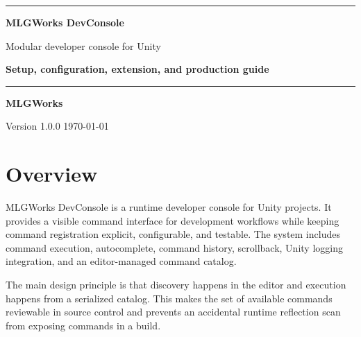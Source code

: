 \documentclass[11pt,a4paper]{article}
\begin{document}
\hypersetup{pageanchor=false}

\begin{titlepage}
  \centering
  \vspace*{28mm}
  {\color{mlgcyan}\rule{0.22\textwidth}{3pt}\par}
  \vspace{8mm}
  {\Huge\bfseries\color{mlgblue} MLGWorks DevConsole\par}
  \vspace{6mm}
  {\Large Modular developer console for Unity\par}
  \vspace{18mm}
  \begin{tcolorbox}[
    width=0.78\textwidth,
    colback=mlgblue!7,
    colframe=mlgblue!55,
    boxrule=0.8pt,
    arc=2mm,
    left=8mm,
    right=8mm,
    top=5mm,
    bottom=5mm]
    \centering
    {\large\bfseries Setup, configuration, extension, and production guide\par}
  \end{tcolorbox}
  \vspace{8mm}
  {\color{mlgcyan}\rule{0.12\textwidth}{1.5pt}\par}
  \vfill
  {\large\bfseries MLGWorks\par}
  \vspace{2mm}
  {\large Version 1.0.0 \textcolor{gray}{\textbullet} \today\par}
\end{titlepage}

\clearpage
{}
\tableofcontents
\clearpage
\hypersetup{pageanchor=true}
\newpage

\section{Overview}

MLGWorks DevConsole is a runtime developer console for Unity projects. It provides a visible command interface for development workflows while keeping command registration explicit, configurable, and testable. The system includes command execution, autocomplete, command history, scrollback, Unity logging integration, and an editor-managed command catalog.

The main design principle is that discovery happens in the editor and execution happens from a serialized catalog. This makes the set of available commands reviewable in source control and prevents an accidental runtime reflection scan from exposing commands in a build.
\end{document}
